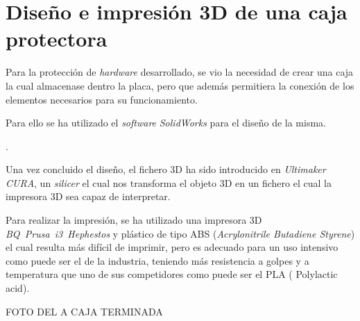 \section{Diseño e impresión 3D de una caja protectora}\label{desarrollo_e_impresion_3d_de_una_caja_protectora}

Para la protección de \emph{hardware} desarrollado, se vio la necesidad de crear una caja la cual almacenase dentro la placa, pero que además permitiera la conexión de los elementos necesarios para su funcionamiento.

Para ello se ha utilizado el \emph{software} \emph{SolidWorks} para el diseño de la misma.

.

Una vez concluido el diseño, el fichero 3D ha sido introducido en \emph{Ultimaker CURA}, un \emph{silicer} el cual nos transforma el objeto 3D en un fichero el cual la impresora 3D sea capaz de interpretar.

Para realizar la impresión, se ha utilizado una impresora 3D \emph{BQ~Prusa~i3~Hephestos} y plástico de tipo ABS (\emph{Acrylonitrile Butadiene Styrene}) el cual resulta más difícil de imprimir, pero es adecuado para un uso intensivo como puede ser el de la industria, teniendo más resistencia a golpes y a temperatura que uno de sus competidores como puede ser el PLA ( Polylactic acid).


FOTO DEL A CAJA TERMINADA

